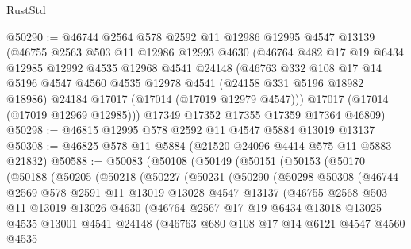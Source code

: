 \begin{lexlean}{RustStd}
\begin{coremodule}
@50290 := @46744
    @2564
    @578
    @2592
    @11
    @12986
    @12995
    @4547
    @13139
    (@46755
      @2563
      @503
      @11
      @12986
      @12993
      @4630
      (@46764
        @482
        @17
        @19
        @6434
        @12985
        @12992
        @4535
        @12968
        @4541
        @24148
        (@46763
          @332
          @108
          @17
          @14
          @5196
          @4547
          @4560
          @4535
          @12978
          @4541
          (@24158 @331 @5196 @18982 @18986)
          @24184
          @17017
          (@17014 (@17019 @12979 @4547)))
        @17017
        (@17014 (@17019 @12969 @12985)))
      @17349
      @17352
      @17355
      @17359
      @17364
      @46809)
@50298 := @46815 @12995 @578 @2592 @11 @4547 @5884 @13019 @13137
@50308 := @46825 @578 @11 @5884 (@21520 @24096 @4414 @575 @11 @5883 @21832)
@50588 := @50083
    (@50108
      (@50149
        (@50151
          (@50153
            (@50170
              (@50188
                (@50205
                  (@50218
                    (@50227
                      (@50231
                        (@50290
                          (@50298
                            @50308
                            (@46744
                              @2569
                              @578
                              @2591
                              @11
                              @13019
                              @13028
                              @4547
                              @13137
                              (@46755
                                @2568
                                @503
                                @11
                                @13019
                                @13026
                                @4630
                                (@46764
                                  @2567
                                  @17
                                  @19
                                  @6434
                                  @13018
                                  @13025
                                  @4535
                                  @13001
                                  @4541
                                  @24148
                                  (@46763
                                    @680
                                    @108
                                    @17
                                    @14
                                    @6121
                                    @4547
                                    @4560
                                    @4535

\end{coremodule}
\end{lexlean}
